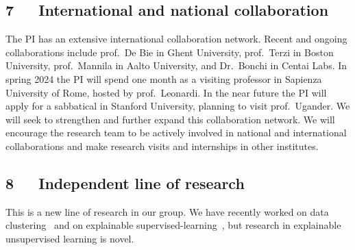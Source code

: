 \documentclass[a4paper,11pt]{article}
\begin{document}
\subsection*{7~~~International and national collaboration}


The PI has an extensive international collaboration network. 
Recent and ongoing collaborations include
prof.\ De Bie in Ghent University, 
prof.\ Terzi in Boston University,
prof.\ Mannila in Aalto University, and 
Dr.\ Bonchi in Centai Labs.
In spring 2024 the PI will spend one month as a visiting professor 
in Sapienza University of Rome, hosted by prof.\ Leonardi.
In the near future the PI will apply for a sabbatical in Stanford University, 
planning to visit prof.\ Ugander. 
We will seek to strengthen and further expand this collaboration network.
We will encourage the research team to be actively involved in national and international collaborations
and make research visits and internships in other institutes.

\subsection*{8~~~Independent line of research}


This is a new line of research in our group. 
We have recently worked on data clustering~\cite{spoerhase2023constant,thejaswi2021diversity}
and on explainable supervised-learning~\cite{ciaperoni2023concise,zhang2020diverse,zhang2023regularized}, 
but research in explainable unsupervised learning is novel.


{\small
\setlength{\bibsep}{0pt}


}

% 
\end{document}
